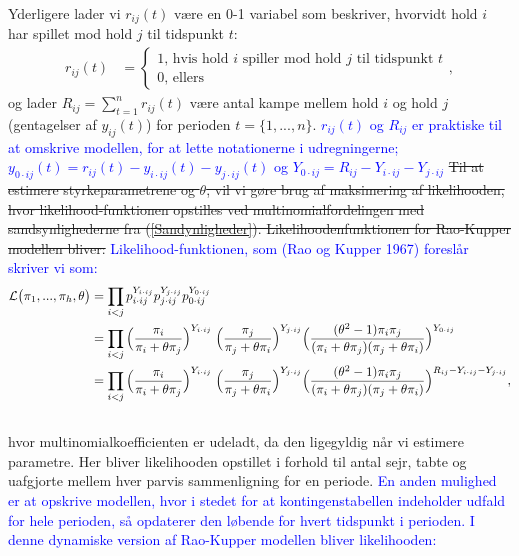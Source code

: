 \documentclass[11pt,a4paper]{article}
\begin{document}
Yderligere lader vi $r_{ij}(t)$ være en 0-1 variabel som beskriver, hvorvidt hold $i$ har spillet mod hold $j$ til tidspunkt $t$:
\begin{align*}
r_{ij}(t)&=\begin{cases}
1\text{, hvis hold $i$ spiller mod hold $j$ til tidspunkt $t$}\\
0\text{, ellers}
\end{cases},
\end{align*}
og lader $R_{ij}=\sum_{t=1}^nr_{ij}(t)$ være antal kampe mellem hold $i$ og hold $j$ (gentagelser af $y_{ij}(t)$) for perioden $t=\{1,...,n\}$. \textcolor{blue}{$r_{ij}(t)$ og $R_{ij}$ er praktiske til at omskrive modellen, for at lette notationerne i udregningerne; $y_{0\cdot ij}(t)=r_{ij}(t)-y_{i\cdot ij}(t)-y_{j\cdot ij}(t)$ og $Y_{0\cdot ij}=R_{ij}-Y_{i\cdot ij}-Y_{j\cdot ij}$}
\sout{Til at estimere styrkeparametrene og $\theta$, vil vi gøre brug af maksimering af likelihooden, hvor likelihood-funktionen opstilles ved multinomialfordelingen med sandsynlighederne fra (\ref{Sandynligheder}). Likelihoodenfunktionen for Rao-Kupper modellen bliver:}
\textcolor{blue}{Likelihood-funktionen, som (Rao og Kupper 1967) foreslår skriver vi som:}
\begin{align}
\mathcal{L}\big{(}\pi_1,...,\pi_h,\theta\big{)} &= \prod_{i<j}p_{i\cdot ij}^{Y_{i\cdot ij}}p_{j\cdot ij}^{Y_{j\cdot ij}}p_{0\cdot ij}^{Y_{0\cdot ij}}  \nonumber\\
&= \prod_{i<j}\Big{(}\frac{\pi_i}{\pi_i+\theta\pi_j}\Big{)}^{Y_{i\cdot ij}} \label{func:LikelihoodUdenBeta}
\;\Big{(}\frac{\pi_j}{\pi_j+\theta\pi_i}\Big{)}^{Y_{j\cdot ij}}
\Big{(}\frac{(\theta^2-1)\pi_i \pi_j}{(\pi_i+\theta\pi_j)(\pi_j+\theta\pi_i)}\Big{)}^{Y_{0\cdot ij}}\\
&=\prod_{i<j}\Big{(}\frac{\pi_i}{\pi_i+\theta\pi_j}\Big{)}^{Y_{i\cdot ij}}
\;\Big{(}\frac{\pi_j}{\pi_j+\theta\pi_i}\Big{)}^{Y_{j\cdot ij}}
\Big{(}\frac{(\theta^2-1)\pi_i  \pi_j}{(\pi_i+\theta\pi_j)(\pi_j+\theta\pi_i)}\Big{)}^{R_{ij}-{Y_{i\cdot ij}}-{Y_{j\cdot ij}}},\nonumber\\ \nonumber
\end{align}
hvor multinomialkoefficienten er udeladt, da den ligegyldig når vi estimere parametre. Her bliver likelihooden opstillet i forhold til antal sejr, tabte og uafgjorte mellem hver parvis sammenligning for en periode.\textcolor{blue}{ En anden mulighed er at opskrive modellen, hvor i stedet for at kontingenstabellen indeholder udfald for hele perioden, så opdaterer den løbende for hvert tidspunkt i perioden. I denne dynamiske version af Rao-Kupper modellen bliver likelihooden:}
\end{document}
